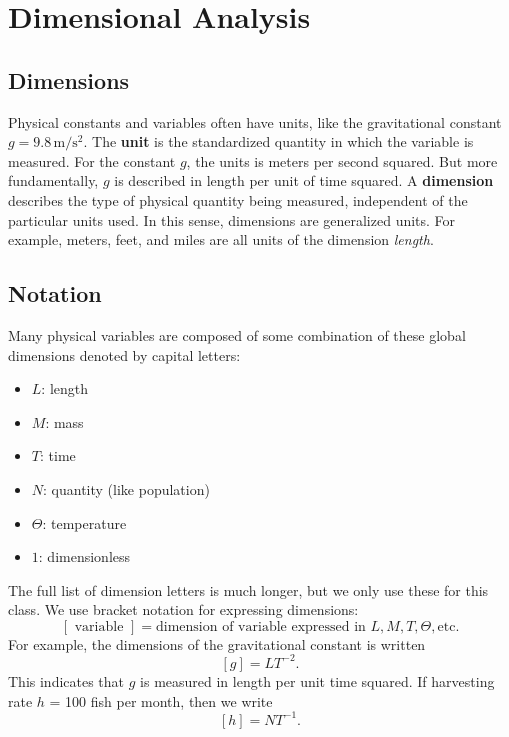 \documentclass[11pt,letterpaper]{article}
\begin{document}

\section{Dimensional Analysis}

\subsection{Dimensions}
Physical constants and variables often have units, like the gravitational constant $g= 9.8 \,\mathrm{m/s^2}$. The \textbf{unit} is the standardized quantity in which the variable is measured. For the constant $g$, the units is meters per second squared. But more fundamentally, $g$ is described in length per unit of time squared. A \textbf{dimension} describes the type of physical quantity being measured, independent of the particular units used. In this sense, dimensions are generalized units. For example, meters, feet, and miles are all units of the dimension \textit{length}.

\subsection{Notation}
Many physical variables are composed of some combination of these global dimensions denoted by capital letters:
\begin{itemize}
    \item $L$: length
    \item $M$: mass
    \item $T$: time 
    \item $N$: quantity (like population)
    \item $\Theta$: temperature
    \item $1$: dimensionless
\end{itemize}
The full list of dimension letters is much longer, but we only use these for this class. We use bracket notation for expressing dimensions: 
$$
[ \text{ variable } ]  = \text{dimension of variable expressed in }L,M,T,\Theta, \text{etc}.
$$
For example, the dimensions of the gravitational constant is written
$$
[g] = LT^{-2}.$$ 
This indicates that $g$ is measured in length per unit time squared. If harvesting rate $h$ = 100 fish per month, then we write
$$[h]=NT^{-1}.$$ 
\end{document}
